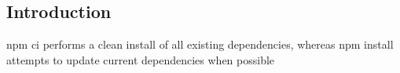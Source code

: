 
\subsection{Introduction}

npm ci performs a clean install of all existing dependencies, whereas npm install attempts to update current dependencies when possible


